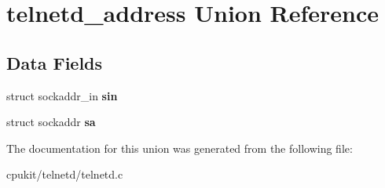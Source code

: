 \hypertarget{uniontelnetd__address}{}\section{telnetd\+\_\+address Union Reference}
\label{uniontelnetd__address}
\subsection*{Data Fields}
\begin{DoxyCompactItemize}
\item 
\mbox{\label{uniontelnetd__address_a9cc68b722aeda6d9d47a7a9b716462fd}} 
struct sockaddr\+\_\+in {\bfseries sin}
\item 
\mbox{\label{uniontelnetd__address_a693eff373c8635c72bd8e020efda0611}} 
struct sockaddr {\bfseries sa}
\end{DoxyCompactItemize}


The documentation for this union was generated from the following file\+:\begin{DoxyCompactItemize}
\item 
cpukit/telnetd/telnetd.\+c\end{DoxyCompactItemize}
